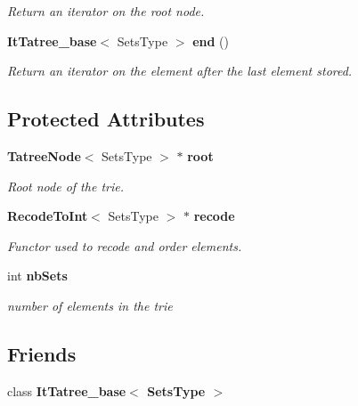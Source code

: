 \begin{CompactItemize}
\begin{CompactList}\small\item\em Return an iterator on the root node. \item\end{CompactList}\item 
{\bf It\-Tatree\_\-base}$<$ Sets\-Type $>$ {\bf end} ()\label{class_tatree__base_7021c1f8a67b2aea0d0f7675eb4a1167}

\begin{CompactList}\small\item\em Return an iterator on the element after the last element stored. \item\end{CompactList}\end{CompactItemize}
\subsection*{Protected Attributes}
\begin{CompactItemize}
\item 
{\bf Tatree\-Node}$<$ Sets\-Type $>$ $\ast$ {\bf root}\label{class_tatree__base_41ed3923edf2e25c6f9584a925e42291}

\begin{CompactList}\small\item\em Root node of the trie. \item\end{CompactList}\item 
{\bf Recode\-To\-Int}$<$ Sets\-Type $>$ $\ast$ {\bf recode}\label{class_tatree__base_4120099089ee2c29dd671e16aa7f5b3e}

\begin{CompactList}\small\item\em Functor used to recode and order elements. \item\end{CompactList}\item 
int {\bf nb\-Sets}\label{class_tatree__base_8a743634952a09c67867d0ed62c2b253}

\begin{CompactList}\small\item\em number of elements in the trie \item\end{CompactList}\end{CompactItemize}
\subsection*{Friends}
\begin{CompactItemize}
\item 
class {\bf It\-Tatree\_\-base$<$ Sets\-Type $>$}\label{class_tatree__base_1ce67181fc35f375e5115a7dfb1f0b3c}

\end{CompactItemize}


